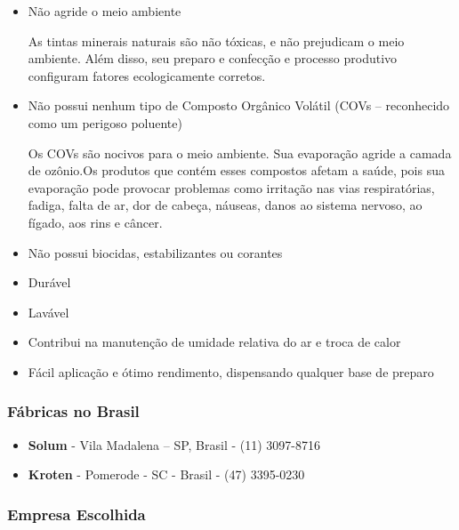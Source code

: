 	\begin{itemize}

		\item Não agride o meio ambiente

	As tintas minerais naturais são não tóxicas, e não prejudicam o meio   ambiente. Além disso, seu preparo e confecção e processo produtivo configuram fatores ecologicamente corretos.

		\item Não possui nenhum tipo de Composto Orgânico Volátil (COVs – reconhecido como um perigoso poluente)

	Os COVs são nocivos para o meio ambiente. Sua evaporação agride a camada de ozônio.Os produtos que contém esses compostos afetam a saúde, pois sua evaporação pode provocar problemas como irritação nas vias respiratórias, fadiga, falta de ar, dor de cabeça, náuseas, danos ao sistema nervoso, ao fígado, aos rins e câncer.
 
		\item Não possui biocidas, estabilizantes ou corantes
		
		\item Durável
		
		\item Lavável
		
		\item Contribui na manutenção de umidade relativa do ar e troca de calor
		
		\item Fácil aplicação e ótimo rendimento, dispensando qualquer base de preparo
 
	\end{itemize}

\subsubsection*{\textbf{Fábricas no Brasil}}

	\begin{itemize}

		\item \textbf{Solum} - Vila Madalena – SP,  Brasil -  (11) 3097-8716 

		\item \textbf{Kroten} - Pomerode - SC - Brasil - (47) 3395-0230 

	\end{itemize}

\subsubsection*{\textbf{Empresa Escolhida}} 

